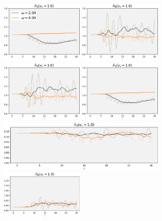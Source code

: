 \begin{figure}[!hbt]
    \centering
    \includegraphics[width=0.35\textwidth]{graph/occupation/occupation_site_2_vc_10.pdf}
    \includegraphics[width=0.35\textwidth]{graph/occupation/occupation_site_0_vc_10.pdf}
    \includegraphics[width=0.35\textwidth]{graph/occupation/occupation_site_3_vc_10.pdf}
    \includegraphics[width=0.35\textwidth]{graph/occupation/occupation_site_1_vc_10.pdf}
    \includegraphics[width=0.71\textwidth]{graph/occupation/occupation_site_4_vc_10.pdf}
    \includegraphics[width=0.35\textwidth]{graph/occupation/occupation_site_9_vc_10.pdf}

\end{figure}
